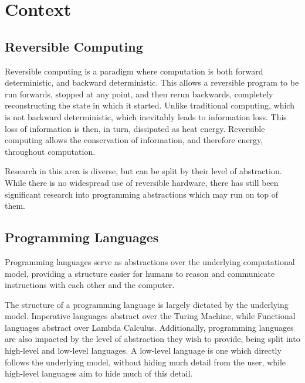 \chapter{Context}


\section{Reversible Computing}


Reversible computing is a paradigm where computation is both forward deterministic, and backward deterministic\cite{IntroductionToReversibleComputing}. This allows a reversible program to be run forwards, stopped at any point, and then rerun backwards, completely reconstructing the state in which it started.
Unlike traditional computing, which is not backward deterministic, which inevitably leads to information loss. This loss of information is then, in turn, dissipated as heat energy\cite{landauerIrreversibility}. Reversible computing allows the conservation of information, and therefore energy, throughout computation\cite{Landauer}.

Research in this area is diverse, but can be split by their level of abstraction. While there is no widespread use of reversible hardware, there has still been significant research into programming abstractions which may run on top of them.

\section{Programming Languages}

Programming languages serve as abstractions over the underlying computational model, providing a structure easier for humans to reason and communicate instructions with each other and the computer. 

The structure of a programming language is largely dictated by the underlying model. Imperative languages abstract over the Turing Machine\cite{onComputableNumbers}, while Functional languages abstract over Lambda Calculus\cite{Lambda}. Additionally, programming languages are also impacted by the level of abstraction they wish to provide, being split into high-level and low-level languages. A low-level language is one which directly follows the underlying model, without hiding much detail from the user, while high-level languages aim to hide much of this detail.

